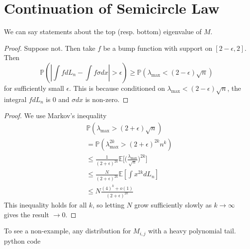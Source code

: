 \section{Continuation of Semicircle Law}
We can say statements about the top (resp. bottom) eigenvalue of $M$.
\begin{proof}
    Suppose not. Then take $f$ be a bump function with support on $[2-\epsilon, 2]$. Then \[
    \mathbb{P}(|\int f dL_n - \int f \sigma dx|>\epsilon) \geq \mathbb{P}(\lambda_{\max}< (2-\epsilon)\sqrt{n})
    \]
    for sufficiently small $\epsilon$. This is because conditioned on $\lambda_{\max}<(2-\epsilon)\sqrt{n}$, the integral $f d L_n$ is $0$ and $\sigma dx$ is non-zero.
\end{proof}
\begin{proof}
    We use Markov's inequality \begin{align*}
        &\mathbb{P}(\lambda_{\max} > (2+\epsilon)\sqrt{n})
    \\
    &=\mathbb{P}(\lambda_{\max}^{2k} > (2+\epsilon)^{2k}n^k)
    \\
    &\leq \frac{1}{(2+\epsilon)^{2k}}\mathbb{E}\Big[\Big(\frac{\lambda_{\max}}{\sqrt{n}}\Big)^{2k}\Bigg]
    \\
    &\leq \frac{N}{(2+\epsilon)^{2k}}\mathbb{E}[\int x^{2k} dL_n]
    \\
    &\leq N\frac{(4)^k+o(1)}{(2+\epsilon)^{2k}}
    \end{align*}
    This inequality holds for all $k$, so letting $N$ grow sufficiently slowly as $k\to \infty$ gives the result $\to 0$.
\end{proof}
\begin{remark}
    To see a non-example, any distribution for $M_{i,j}$ with a heavy polynomial tail. \todo python code
\end{remark}